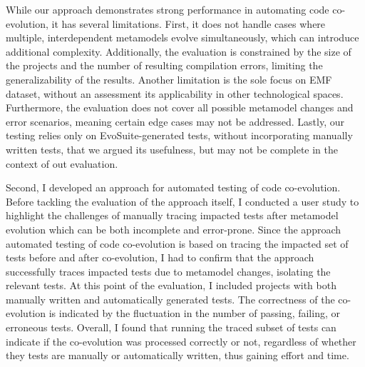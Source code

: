 

While our approach demonstrates strong performance in automating code co-evolution, it has several limitations. First, it does not handle cases where multiple, interdependent metamodels evolve simultaneously, which can introduce additional complexity. Additionally, the evaluation is constrained by the size of the projects and the number of resulting compilation errors, limiting the generalizability of the results. Another limitation is the sole focus on EMF dataset, without an assessment its applicability in other technological spaces. Furthermore, the evaluation does not cover all possible metamodel changes and error scenarios, meaning certain edge cases may not be addressed. Lastly, our testing relies only on EvoSuite-generated tests, without incorporating manually written tests, that we argued its usefulness, but may not be complete in the context of out evaluation.



Second, I developed an approach for automated testing of code co-evolution. 
Before tackling the evaluation of the approach itself, I conducted a user study to highlight the challenges of manually tracing impacted tests after metamodel evolution which can be both incomplete and error-prone. Since the approach automated testing of code co-evolution is based on tracing the impacted set of tests before and after co-evolution, I had to confirm that the approach successfully traces impacted tests due to metamodel changes, isolating the relevant tests. At this point of the evaluation, I included projects with both manually written and automatically generated tests. The correctness of the co-evolution is indicated by the fluctuation in the number of passing, failing, or erroneous tests. Overall, I found that running the traced subset of tests can indicate if the co-evolution was processed correctly or not, regardless of whether they tests are manually or automatically written, thus gaining effort and time.

